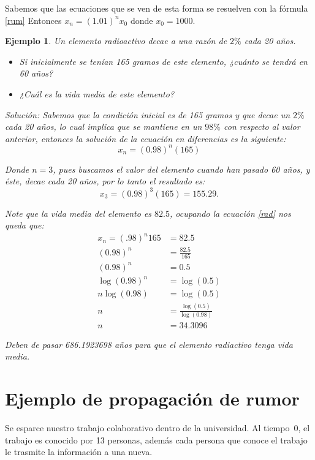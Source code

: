 \documentclass{report}
\newtheorem{ejemplo}{Ejemplo}
\begin{document}
Sabemos que las ecuaciones que se ven de esta forma se resuelven con
la fórmula \ref{rum} Entonces $x_n=(1.01)^nx_0$ donde $x_0=1000$.



\begin{ejemplo}
Un elemento radioactivo decae a una razón de $2\%$ cada 20 años.
\begin{itemize}
\item Si inicialmente se tenían 165 gramos de este elemento, ¿cuánto
  se tendrá en 60 años?
 \item ¿Cuál es la vida media de este elemento?
\end{itemize}

\textit{Solución:} Sabemos que la condición inicial es de 165 gramos y
que decae un $2\%$ cada 20 años, lo cual implica que se mantiene en un
$98\%$ con respecto al valor anterior, entonces la solución de la
ecuación en diferencias es la siguiente:
\begin{equation}
  \label{rad}
  x_n=(0.98)^n(165)
\end{equation}

Donde $n=3$, pues buscamos el valor del elemento cuando han pasado 60
años, y éste, decae cada 20 años, por lo tanto el resultado es:
$$x_{3}=(0.98)^3(165)= 155.29.$$

Note que la vida media del elemento es $82.5$, ocupando la ecuación
\ref{rad} nos queda que:
\begin{align*}
  x_n=(.98)^n165&=82.5\\
  (0.98)^n&=\frac{82.5}{\ 165}\\
  (0.98)^n&=0.5\\
  \log{(0.98)^n}&=\log{(0.5)}\\
  n\log{(0.98)}&=\log{(0.5)}\\
  n&=\frac{\log(0.5)}{\log(0.98)}\\
  n&=34.3096     
\end{align*}  

Deben de pasar 686.1923698 años para que el elemento radiactivo tenga
vida media.
\end{ejemplo}


\section{Ejemplo de propagación de rumor}

Se esparce nuestro trabajo colaborativo dentro de la universidad. Al
tiempo~0, el trabajo es conocido por 13 personas, además cada persona que
conoce el trabajo le trasmite la información a una nueva.
\end{document}

